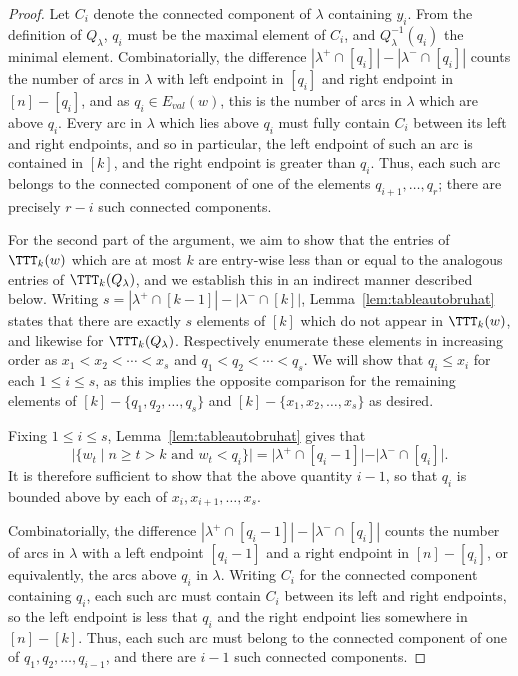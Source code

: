 \documentclass[12pt]{article}
\theoremstyle{definition}
\theoremstyle{remark}
\numberwithin{equation}{section}
\renewcommand{\setminus}{-}
\newcommand{\EV}{E_{val}}
\begin{document}
\begin{proof}
Let $C_{i}$ denote the connected component of $\lambda$ containing $y_{i}$.  
From the definition of $Q_{\lambda}$, $q_{i}$ must be the maximal element of $C_{i}$,  and $Q_{\lambda}^{-1}(q_{i})$ the minimal element.  
Combinatorially, the difference $|\lambda^{+} \cap [q_{i}]| - |\lambda^{-} \cap [q_{i}]|$ counts the number of arcs in $\lambda$ with left endpoint in $[q_{i}]$ and right endpoint in $[n] \setminus [q_{i}]$, and as $q_{i} \in \EV(w)$, this is the number of arcs in $\lambda$ which are above $q_{i}$.  
Every arc in $\lambda$ which lies above $q_{i}$ must fully contain $C_{i}$ between its left and right endpoints, and so in particular, the left endpoint of such an arc is contained in $[k]$, and the right endpoint is greater than $q_{i}$.  
Thus, each such arc belongs to the connected component of one of the elements $q_{i+1}, \ldots, q_{r}$; there are precisely $r - i$ such connected components.

For the second part of the argument, we aim to show that the entries of $\TTT_{k}(w)$ which are at most $k$ are entry-wise less than or equal to the analogous entries of $\TTT_{k}(Q_{\lambda})$, and we establish this in an indirect manner described below.  
Writing $s = |\lambda^{+} \cap [k-1]| - |\lambda^{-} \cap [k]|$, Lemma~\ref{lem:tableautobruhat} states that there are exactly $s$ elements of $[k]$ which do not appear in $\TTT_{k}(w)$, and likewise for $\TTT_{k}(Q_{\lambda})$.  
Respectively enumerate these elements in increasing order as $x_{1} < x_{2} < \cdots < x_{s}$ and $q_{1} < q_{2} < \cdots < q_{s}$.  
We will show that $q_{i} \le x_{i}$ for each $1 \le i \le s$, as this implies the opposite comparison for the remaining elements of $[k] \setminus \{q_{1}, q_{2}, \ldots, q_{s}\}$ and $[k] \setminus \{x_{1}, x_{2}, \ldots, x_{s}\}$ as desired.  

Fixing $1 \le i \le s$, Lemma~\ref{lem:tableautobruhat} gives that
\[
|\{ w_{t} \;|\; \text{$n \ge t > k$ and $w_{t} < q_{i}$} \}| = |\lambda^{+} \cap [q_{i} - 1]| - |\lambda^{-} \cap [q_{i}]|.
\]
It is therefore sufficient to show that the above quantity $i-1$, so that $q_{i}$ is bounded above by each of $x_{i}, x_{i+1}, \ldots, x_{s}$.

Combinatorially, the difference $|\lambda^{+} \cap [q_{i} - 1]| - |\lambda^{-} \cap [q_{i}]|$ counts the number of arcs in $\lambda$ with a left endpoint $[q_{i} -1]$ and a right endpoint in $[n] \setminus [q_{i}]$, or equivalently, the arcs above $q_{i}$ in $\lambda$.  
Writing $C_{i}$ for the connected component containing $q_{i}$, each such arc must contain $C_{i}$ between its left and right endpoints, so the left endpoint is less that $q_{i}$ and the right endpoint lies somewhere in $[n] \setminus [k]$.  
Thus, each such arc must belong to the connected component of one of $q_{1}, q_{2}, \ldots, q_{i-1}$, and there are $i-1$ such connected components.
\end{proof}
\end{document}
